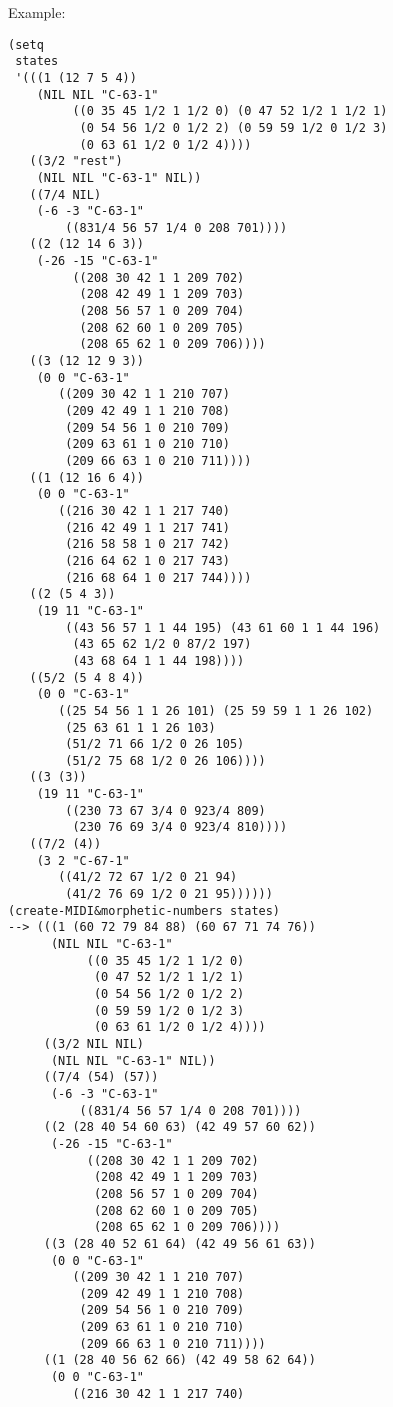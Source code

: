 \vspace{0.5cm}
\noindent Example:
\begin{verbatim}
(setq
 states
 '(((1 (12 7 5 4))
    (NIL NIL "C-63-1"
         ((0 35 45 1/2 1 1/2 0) (0 47 52 1/2 1 1/2 1)
          (0 54 56 1/2 0 1/2 2) (0 59 59 1/2 0 1/2 3)
          (0 63 61 1/2 0 1/2 4))))
   ((3/2 "rest")
    (NIL NIL "C-63-1" NIL))
   ((7/4 NIL)
    (-6 -3 "C-63-1"
        ((831/4 56 57 1/4 0 208 701))))
   ((2 (12 14 6 3))
    (-26 -15 "C-63-1"
         ((208 30 42 1 1 209 702)
          (208 42 49 1 1 209 703)
          (208 56 57 1 0 209 704)
          (208 62 60 1 0 209 705)
          (208 65 62 1 0 209 706))))
   ((3 (12 12 9 3))
    (0 0 "C-63-1"
       ((209 30 42 1 1 210 707)
        (209 42 49 1 1 210 708)
        (209 54 56 1 0 210 709)
        (209 63 61 1 0 210 710)
        (209 66 63 1 0 210 711))))
   ((1 (12 16 6 4))
    (0 0 "C-63-1"
       ((216 30 42 1 1 217 740)
        (216 42 49 1 1 217 741)
        (216 58 58 1 0 217 742)
        (216 64 62 1 0 217 743)
        (216 68 64 1 0 217 744))))
   ((2 (5 4 3))
    (19 11 "C-63-1"
        ((43 56 57 1 1 44 195) (43 61 60 1 1 44 196)
         (43 65 62 1/2 0 87/2 197)
         (43 68 64 1 1 44 198))))
   ((5/2 (5 4 8 4))
    (0 0 "C-63-1"
       ((25 54 56 1 1 26 101) (25 59 59 1 1 26 102)
        (25 63 61 1 1 26 103)
        (51/2 71 66 1/2 0 26 105)
        (51/2 75 68 1/2 0 26 106))))
   ((3 (3))
    (19 11 "C-63-1"
        ((230 73 67 3/4 0 923/4 809)
         (230 76 69 3/4 0 923/4 810))))
   ((7/2 (4))
    (3 2 "C-67-1"
       ((41/2 72 67 1/2 0 21 94)
        (41/2 76 69 1/2 0 21 95))))))
(create-MIDI&morphetic-numbers states)
--> (((1 (60 72 79 84 88) (60 67 71 74 76))
      (NIL NIL "C-63-1"
           ((0 35 45 1/2 1 1/2 0)
            (0 47 52 1/2 1 1/2 1)
            (0 54 56 1/2 0 1/2 2)
            (0 59 59 1/2 0 1/2 3)
            (0 63 61 1/2 0 1/2 4))))
     ((3/2 NIL NIL)
      (NIL NIL "C-63-1" NIL))
     ((7/4 (54) (57))
      (-6 -3 "C-63-1"
          ((831/4 56 57 1/4 0 208 701))))
     ((2 (28 40 54 60 63) (42 49 57 60 62))
      (-26 -15 "C-63-1"
           ((208 30 42 1 1 209 702)
            (208 42 49 1 1 209 703)
            (208 56 57 1 0 209 704)
            (208 62 60 1 0 209 705)
            (208 65 62 1 0 209 706))))
     ((3 (28 40 52 61 64) (42 49 56 61 63))
      (0 0 "C-63-1"
         ((209 30 42 1 1 210 707)
          (209 42 49 1 1 210 708)
          (209 54 56 1 0 210 709)
          (209 63 61 1 0 210 710)
          (209 66 63 1 0 210 711))))
     ((1 (28 40 56 62 66) (42 49 58 62 64))
      (0 0 "C-63-1"
         ((216 30 42 1 1 217 740)

\end{verbatim}
